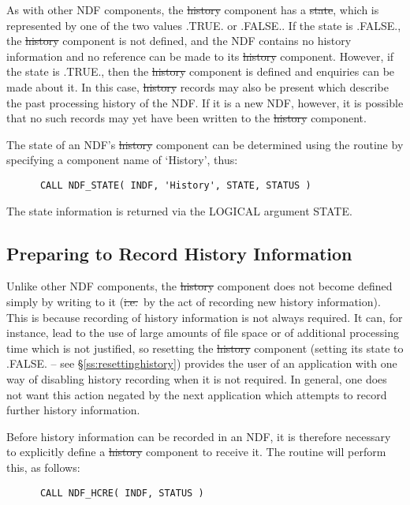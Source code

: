 As with other NDF components, the \st{history\/} component has a
\st{state}, which is represented by one of the two values .TRUE. or 
.FALSE..  If the state is .FALSE., the \st{history\/} component is not
defined, and the NDF contains no history information and no reference
can be made to its \st{history\/} component. However, if the state is
.TRUE., then the \st{history\/} component is defined and enquiries can
be made about it. In this case, \st{history\/} records may also be present
which describe the past processing history of the NDF. If it is a new
NDF, however, it is possible that no such records may yet have been
written to the \st{history\/} component.

The state of an NDF's \st{history\/} component can be determined using
the  routine by specifying a component name of `History',
thus:

\small
\begin{verbatim}
      CALL NDF_STATE( INDF, 'History', STATE, STATUS )
\end{verbatim}
\normalsize

The state information is returned via the LOGICAL argument STATE.

\subsection{\label{ss:historycreation}Preparing to Record History Information}

Unlike other NDF components, the \st{history\/} component does not
become defined simply by writing to it (\st{i.e.}\ by the act of
recording new history information). This is because recording of
history information is not always required.  It can, for instance,
lead to the use of large amounts of file space or of additional
processing time which is not justified, so resetting the \st{history\/}
component (setting its state to .FALSE. -- see
\S\ref{ss:resettinghistory}) provides the user of an application with
one way of disabling history recording when it is not required.
In general, one does not want this action negated by the next
application which attempts to record further history information.

Before history information can be recorded in an NDF, it is therefore
necessary to explicitly define a \st{history\/} component to receive it.
The  routine will perform this, as follows:

\small
\begin{verbatim}
      CALL NDF_HCRE( INDF, STATUS )
\end{verbatim}
\normalsize

